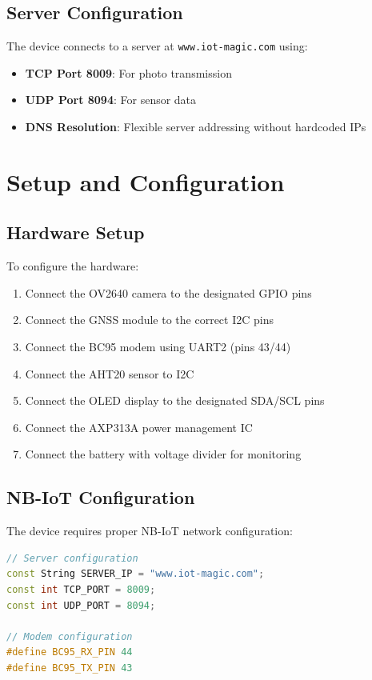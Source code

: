 \documentclass[11pt,a4paper]{article}
\begin{document}
\subsection{Server Configuration}

The device connects to a server at \texttt{www.iot-magic.com} using:

\begin{itemize}
    \item \textbf{TCP Port 8009}: For photo transmission
    \item \textbf{UDP Port 8094}: For sensor data
    \item \textbf{DNS Resolution}: Flexible server addressing without hardcoded IPs
\end{itemize}

\section{Setup and Configuration}

\subsection{Hardware Setup}

To configure the hardware:

\begin{enumerate}
    \item Connect the OV2640 camera to the designated GPIO pins
    \item Connect the GNSS module to the correct I2C pins
    \item Connect the BC95 modem using UART2 (pins 43/44)
    \item Connect the AHT20 sensor to I2C
    \item Connect the OLED display to the designated SDA/SCL pins
    \item Connect the AXP313A power management IC
    \item Connect the battery with voltage divider for monitoring
\end{enumerate}

\subsection{NB-IoT Configuration}

The device requires proper NB-IoT network configuration:

\begin{lstlisting}[language=C++, caption=NB-IoT Configuration]
// Server configuration
const String SERVER_IP = "www.iot-magic.com";
const int TCP_PORT = 8009;
const int UDP_PORT = 8094;

// Modem configuration
#define BC95_RX_PIN 44
#define BC95_TX_PIN 43
\end{lstlisting}
\end{document}
